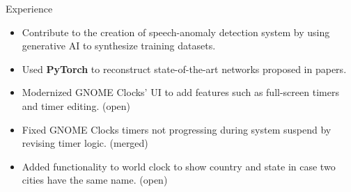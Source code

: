 \documentclass{resume} %
\begin{document}
\begin{workSection}{Experience}
	
	\experienceItem[
	company=Texas Instruments,
	location=Dallas{,} TX,
	position=Upcoming Information Technology Intern,
	duration=Summer 2024,
	]
	
	\experienceItem[
	company=UTEP,
	location=El Paso{,} TX,
	position=Undergraduate Research Assistant,
	duration=January 2024 - present,
	]
	\begin{itemize}
		\vspace{-0.5em}
		\itemsep -6pt {}
		\item Contribute to the creation of speech-anomaly detection system by using generative AI to synthesize training datasets.
		\item Used \textbf{PyTorch} to reconstruct state-of-the-art networks proposed in papers.
	\end{itemize}
	
	
	\experienceItem[
	company=GNOME Foundation,
	location=Remote,
	position=Open-Source Contributor,
	duration=December 2023 {-} present
	]
	\begin{itemize}
		\vspace{-0.5em}
		\itemsep -6pt {}
		\item Modernized GNOME Clocks' UI to add features such as full-screen timers and timer editing. (open)
		\item Fixed GNOME Clocks timers not progressing during system suspend by revising timer logic. (merged)
		\item Added functionality to world clock to show country and state in case two cities have the same name. (open)
	\end{itemize}


\end{workSection}
\end{document}

